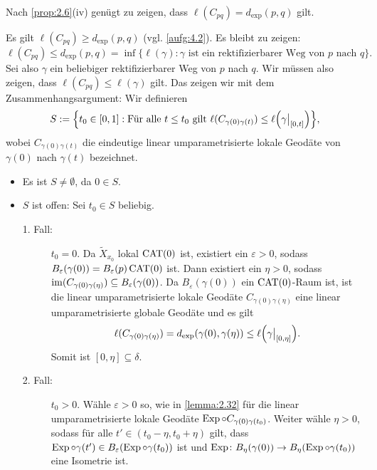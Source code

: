 \begin{beweis}
	Nach \autoref{prop:2.6}(iv) genügt zu zeigen, dass $\ell(C_{pq}) = d_{\exp}(p,q)$ gilt.
	
	Es gilt $\ell(C_{pq}) \geq d_{\exp}(p,q)$ (vgl. \autoref{aufg:4.2}). Es bleibt zu zeigen:
	\[
		\ell(C_{pq}) \leq d_{\exp}(p,q) = \inf\{ \ell(\gamma) : \gamma \text{ ist ein rektifizierbarer Weg von } p \text{ nach } q\}.
	\]
	Sei also $\gamma$ ein beliebiger rektifizierbarer Weg von $p$ nach $q$.
	Wir müssen also zeigen, dass $\ell(C_{pq}) \leq \ell(\gamma)$ gilt.
	Das zeigen wir mit dem Zusammenhangsargument:
	Wir definieren
	\[
		S := \penbrace*{ t_0 \in [0,1] : \text{Für alle } t \leq t_0 \text{ gilt } \ell(C_{\gamma(0)\gamma(t)}) \leq \ell\enbrace*{\gamma \big|_{[0,t]}}},
	\]
	wobei $C_{\gamma(0)\gamma(t)}$ die eindeutige linear umparametrisierte lokale Geodäte von $\gamma(0)$ nach $\gamma(t)$ bezeichnet.
	\begin{itemize}
		\item Es ist $S \neq \emptyset$, da $0 \in S$.
		\item $S$ ist offen:
		Sei $t_0 \in S$ beliebig.
		\begin{description}
			\item [1. Fall:] $t_0 = 0$.
			Da $\tilde{X}_{x_0}$ lokal $\operatorname{CAT(0)}$ ist, existiert ein $\varepsilon > 0$, sodass $B_\varepsilon(\gamma(0)) = B_\varepsilon(p) \operatorname{CAT(0)}$ ist.
			Dann existiert ein $\eta > 0$, sodass $\operatorname{im}(C_{\gamma(0)\gamma(\eta)}) \subseteq B_\varepsilon(\gamma(0))$.
			Da $B_\varepsilon(\gamma(0))$ ein $\operatorname{CAT(0)}$-Raum ist, ist die linear umparametrisierte lokale Geodäte $C_{\gamma(0)\gamma(\eta)}$ eine linear umparametrisierte globale Geodäte und es gilt
			\[
				\ell(C_{\gamma(0)\gamma(\eta)}) = d_{\exp}(\gamma(0),\gamma(\eta)) \leq \ell\enbrace*{\gamma \big|_{[0,\eta]}}.
			\]
			Somit ist $[0,\eta] \subseteq \delta$.
			\item[2. Fall:] $t_0 > 0$.
			Wähle $\varepsilon > 0$ so, wie in \autoref{lemma:2.32} für die linear umparametrisierte lokale Geodäte $\operatorname{Exp} \circ C_{\gamma(0)\gamma(t_0)}$.
			Weiter wähle $\eta > 0$, sodass für alle $t' \in (t_0-\eta, t_0 + \eta)$ gilt, dass $\operatorname{Exp} \circ \gamma(t') \in B_\varepsilon(\operatorname{Exp} \circ \gamma(t_0))$ ist und $\operatorname{Exp} \colon B_\eta(\gamma(0)) \rightarrow B_\eta(\operatorname{Exp}\circ \gamma(t_0))$ eine Isometrie ist.
			

\end{description}
\end{itemize}
\end{beweis}
